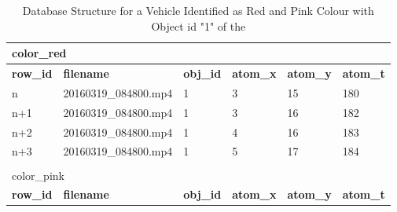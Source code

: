 \begin{table}[hbt]
	\centering 
\caption{Database Structure for a Vehicle Identified as Red and Pink Colour with Object id "1" of the \versionOneRet }
\label{table:dbSample}
\begin{tabular}{llllll}
\multicolumn{6}{l}{{ color\_red}} \\ \hline
\multicolumn{1}{|l|}{\textbf{row\_id}} & \multicolumn{1}{l|}{\textbf{filename}}    & \multicolumn{1}{l|}{\textbf{obj\_id}} & \multicolumn{1}{l|}{\textbf{atom\_x}} & \multicolumn{1}{l|}{\textbf{atom\_y}} & \multicolumn{1}{l|}{\textbf{atom\_t}} \\ \hline
\multicolumn{1}{|l|}{n}                & \multicolumn{1}{l|}{20160319\_084800.mp4} & \multicolumn{1}{l|}{1}                & \multicolumn{1}{l|}{3}                & \multicolumn{1}{l|}{15}               & \multicolumn{1}{l|}{180}              \\ \hline
\multicolumn{1}{|l|}{n+1}              & \multicolumn{1}{l|}{20160319\_084800.mp4} & \multicolumn{1}{l|}{1}                & \multicolumn{1}{l|}{3}                & \multicolumn{1}{l|}{16}               & \multicolumn{1}{l|}{182}              \\ \hline
\multicolumn{1}{|l|}{n+2}              & \multicolumn{1}{l|}{20160319\_084800.mp4} & \multicolumn{1}{l|}{1}                & \multicolumn{1}{l|}{4}                & \multicolumn{1}{l|}{16}               & \multicolumn{1}{l|}{183}              \\ \hline
\multicolumn{1}{|l|}{n+3}              & \multicolumn{1}{l|}{20160319\_084800.mp4} & \multicolumn{1}{l|}{1}                & \multicolumn{1}{l|}{5}                & \multicolumn{1}{l|}{17}               & \multicolumn{1}{l|}{184}              \\ \hline
                                       &                                           &                                       &                                       &                                       &                                       \\
\multicolumn{6}{l}{{ color\_pink}}                                                                                                                                                                                                              \\ \hline
\multicolumn{1}{|l|}{\textbf{row\_id}} & \multicolumn{1}{l|}{\textbf{filename}}    & \multicolumn{1}{l|}{\textbf{obj\_id}} & \multicolumn{1}{l|}{\textbf{atom\_x}} & \multicolumn{1}{l|}{\textbf{atom\_y}} & \multicolumn{1}{l|}{\textbf{atom\_t}} \\ \hline

\end{tabular}
\end{table}
